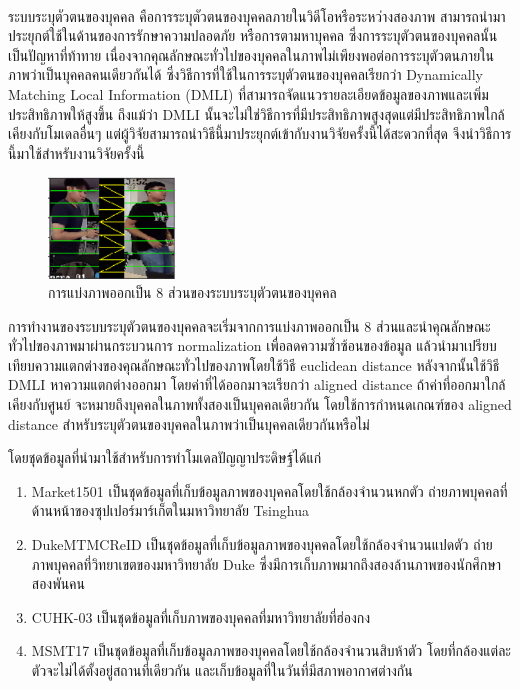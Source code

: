 ระบบระบุตัวตนของบุคคล\textsuperscript{\cite{luo2019alignedreid++}}\textsuperscript{\cite{zhang2017alignedreid}} คือการระบุตัวตนของบุคคลภายในวิดีโอหรือระหว่างสองภาพ สามารถนำมาประยุกต์ใช้ในด้านของการรักษาความปลอดภัย 
หรือการตามหาบุคคล ซึ่งการระบุตัวตนของบุคคลนั้นเป็นปัญหาที่ท้าทาย เนื่องจากคุณลักษณะทั่วไปของบุคคลในภาพไม่เพียงพอต่อการระบุตัวตนภายในภาพว่าเป็นบุคคลคนเดียวกันได้ ซึ่งวิธีการที่ใช้ในการระบุตัวตนของบุคคลเรียกว่า 
Dynamically Matching Local Information (DMLI) ที่สามารถจัดแนวรายละเอียดข้อมูลของภาพและเพิ่มประสิทธิภาพให้สูงขึ้น 
ถึงแม้ว่า DMLI นั้นจะไม่ใช่วิธีการที่มีประสิทธิภาพสูงสุดแต่มีประสิทธิภาพใกล้เคียงกับโมเดลอื่นๆ แต่ผู้วิจัยสามารถนำวิธีนี้มาประยุกต์เข้ากับงานวิจัยครั้งนี้ได้สะดวกที่สุด จึงนำวิธีการนี้มาใช้สำหรับงานวิจัยครั้งนี้

\begin{figure}[!ht]
	\centering
	\includegraphics[width=0.3\textwidth]{chapter2/images/alignedreid.png}
		\caption{การแบ่งภาพออกเป็น 8 ส่วนของระบบระบุตัวตนของบุคคล}
    	\label{fig:alignedreid}
\end{figure}

การทำงานของระบบระบุตัวตนของบุคคลจะเริ่มจากการแบ่งภาพออกเป็น 8 ส่วนและนำคุณลักษณะทั่วไปของภาพมาผ่านกระบวนการ normalization เพื่อลดความซ้ำซ้อนของข้อมูล 
แล้วนำมาเปรียบเทียบความแตกต่างของคุณลักษณะทั่วไปของภาพโดยใช้วิธี euclidean distance หลังจากนั้นใช้วิธี DMLI หาความแตกต่างออกมา โดยค่าที่ได้ออกมาจะเรียกว่า aligned distance ถ้าค่าที่ออกมาใกล้เคียงกับศูนย์
จะหมายถึงบุคคลในภาพทั้งสองเป็นบุคคลเดียวกัน โดยใช้การกำหนดเกณฑ์ของ aligned distance สำหรับระบุตัวตนของบุคคลในภาพว่าเป็นบุคคลเดียวกันหรือไม่

โดยชุดข้อมูลที่นำมาใช้สำหรับการทำโมเดลปัญญาประดิษฐ์ได้แก่
\begin{enumerate}
	\item{Market1501 เป็นชุดข้อมูลที่เก็บข้อมูลภาพของบุคคลโดยใช้กล้องจำนวนหกตัว ถ่ายภาพบุคคลที่ด้านหน้าของซุปเปอร์มาร์เก็ตในมหาวิทยาลัย Tsinghua}
	\item{DukeMTMCReID เป็นชุดข้อมูลที่เก็บข้อมูลภาพของบุคคลโดยใช้กล้องจำนวนแปดตัว ถ่ายภาพบุคคลที่วิทยาเขตของมหาวิทยาลัย Duke ซึ่งมีการเก็บภาพมากถึงสองล้านภาพของนักศึกษาสองพันคน }
	\item{CUHK-03 เป็นชุดข้อมูลที่เก็บภาพของบุคคลที่มหาวิทยาลัยที่ฮ่องกง}
	\item{MSMT17 เป็นชุดข้อมูลที่เก็บข้อมูลภาพของบุคคลโดยใช้กล้องจำนวนสิบห้าตัว โดยที่กล้องแต่ละตัวจะไม่ได้ตั้งอยู่สถานที่เดียวกัน และเก็บข้อมูลที่ในวันที่มีสภาพอากาศต่างกัน}
\end{enumerate}


